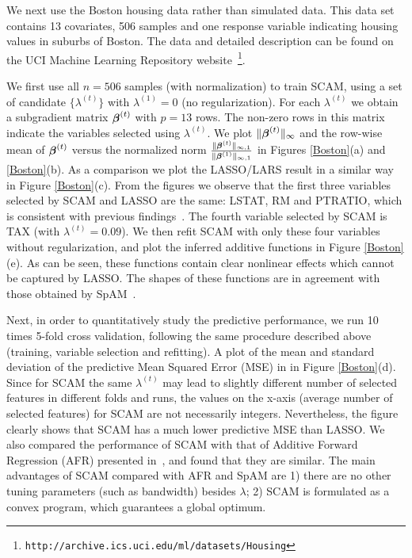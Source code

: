 
We next use the Boston housing data rather than simulated data. This data set
contains 13 covariates, 506 samples and one response variable
indicating housing values in suburbs of Boston. The data and detailed description
can be found on the UCI Machine Learning Repository website~\footnote{\texttt{http://archive.ics.uci.edu/ml/datasets/Housing}}. 

We first use all $n=506$ samples (with normalization) to train SCAM, using
a set of candidate $\{\lambda^{(t)}\}$ with $\lambda^{(1)}=0$ (no regularization). For each $\lambda^{(t)}$
we obtain a subgradient matrix $\boldsymbol{\beta}^{(t)}$ with $p=13$ rows. The non-zero
rows in this matrix indicate the variables selected using $\lambda^{(t)}$. 
We plot $\|\boldsymbol{\beta}^{(t)}\|_{\infty}$ and the row-wise mean of $\boldsymbol{\beta}^{(t)}$ versus the normalized
norm $\frac{\|\boldsymbol{\beta}^{(t)}\|_{\infty,1}}{\|\boldsymbol{\beta}^{(1)}\|_{\infty,1}}$ in Figures \ref{Boston}(a) and \ref{Boston}(b).
As a comparison we plot the LASSO/LARS result in a similar way in Figure \ref{Boston}(c).
From the figures we observe that the first three variables selected by SCAM
and LASSO are the same: LSTAT, RM and PTRATIO, which is consistent with previous findings~\cite{SpAM:07}.
The fourth variable selected by SCAM is TAX (with $\lambda^{(t)}=0.09$).
We then refit SCAM with only these four variables without regularization, and plot the inferred additive
functions in Figure \ref{Boston}(e). As can be seen, these functions contain clear nonlinear effects which cannot be captured
by LASSO. The shapes of these functions are in agreement with those obtained by SpAM~\cite{SpAM:07}.

Next, in order to quantitatively study the predictive performance, we run 10 times 5-fold cross validation, following
the same procedure described above (training, variable selection and
refitting).  A plot of the mean and standard
deviation of the predictive Mean Squared Error (MSE) in in Figure \ref{Boston}(d). Since for SCAM the same $\lambda^{(t)}$ may lead to
slightly different number of selected features in different folds and runs, the values on the x-axis (average number of selected features)
for SCAM are not necessarily integers. Nevertheless, the figure clearly shows that SCAM has a much lower predictive MSE than LASSO. 
We also compared the performance of SCAM with that of Additive Forward Regression (AFR) presented in~\cite{Xi:09}, and found that they are similar.
The main advantages of SCAM compared with AFR and SpAM are 1) there are no other tuning parameters (such as bandwidth)
besides $\lambda$; 2) SCAM is formulated as a convex program, which guarantees a global optimum.

